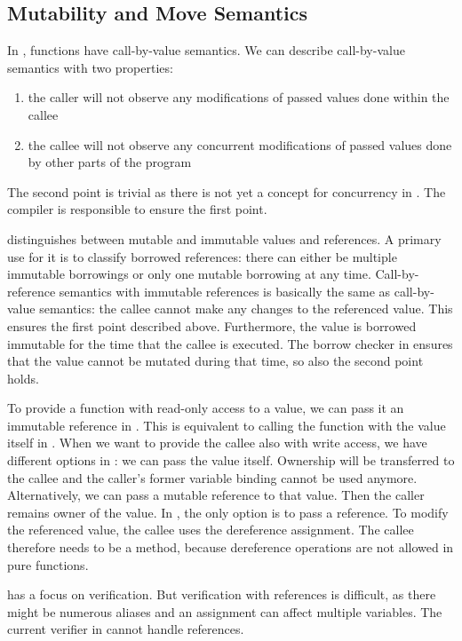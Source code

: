 \subsection{Mutability and Move Semantics}\label{section:design-discussion-mutability}
In \whiley, functions have call-by-value semantics.
We can describe call-by-value semantics with two properties:
\begin{enumerate}
\item the caller will not observe any modifications of passed values done within the callee
\item the callee will not observe any concurrent modifications of passed values done by other parts of the program
\end{enumerate}

The second point is trivial as there is not yet a concept for concurrency in \whiley.
The compiler is responsible to ensure the first point.

\rust distinguishes between mutable and immutable values and references.
A primary use for it is to classify borrowed references:
there can either be multiple immutable borrowings or only one mutable borrowing at any time.
Call-by-reference semantics with immutable references is basically the same as call-by-value semantics:
the callee cannot make any changes to the referenced value.
This ensures the first point described above.
Furthermore, the value is borrowed immutable for the time that the callee is executed.
The borrow checker in \rust ensures that the value cannot be mutated during that time, so also the second point holds.

To provide a function with read-only access to a value, we can pass it an immutable reference in \rust.
This is equivalent to calling the function with the value itself in \whiley.
When we want to provide the callee also with write access, we have different options in \rust:
we can pass the value itself.
Ownership will be transferred to the callee and the caller's former variable binding cannot be used anymore.
Alternatively, we can pass a mutable reference to that value.
Then the caller remains owner of the value.
In \whiley, the only option is to pass a reference.
To modify the referenced value, the callee uses the dereference assignment.
The callee therefore needs to be a method, because dereference operations are not allowed in pure functions.

\whiley has a focus on verification.
But verification with references is difficult, as there might be numerous aliases and an assignment can affect multiple variables.
The current verifier in \whiley cannot handle references.

